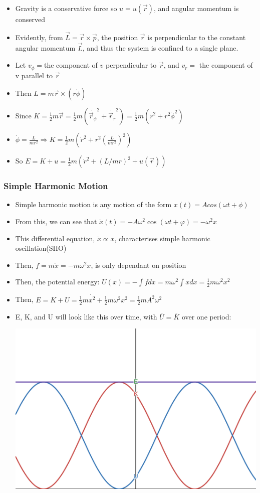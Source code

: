 \documentclass{article}
\begin{document}
\begin{itemize}
    \item Gravity is a conservative force so \(u = u(\vec r)\), and angular momentum is conserved
    \item Evidently, from \(\vec L = \vec r\times\vec p\), the position \(\vec r\) is perpendicular to the constant angular momentum \(\vec L\), and thus the system is confined to a single plane.
    \item Let \(v_{\phi}=\)the component of \(v\) perpendicular to $\vec r$, and \(v_r=\) the component of v parallel to \(\vec r\)
    \item Then \(L=m\vec r\times(r\dot\phi)\)
    \item Since \(K=\frac{1}{2}m\dot{\vec r} = \frac{1}{2}m(\dot{\vec r_{\phi}}^2 +\dot{\vec r_r}^2)=\frac{1}{2}m(\dot r ^2 + r^2\dot\phi ^2)\)
    \item \(\dot\phi = \frac{L}{mr^2} \Rightarrow K = \frac{1}{2}m(\dot r ^2 + r^2(\frac{L}{mr^2})^2)\)
    \item So \(E = K + u = \frac{1}{2}m(\dot r^2 + (L/mr)^2 + u(\vec r))\)
    
\end{itemize}

\subsubsection*{Simple Harmonic Motion}

\begin{itemize}
    \item Simple harmonic motion is any motion of the form \(x(t) = Acos(\omega t + \phi)\)
    \item From this, we can see that \(\ddot x(t) = -A\omega^2\cos(\omega t+\varphi) = -\omega^2x\)
    \item This differential equation, \(\ddot x \propto x\), characterises simple harmonic oscillation(SHO)
    \item Then, \(f =m\ddot x = -m\omega^2x\), is only dependant on position
    \item Then, the potential energy: \(U(x) = -\int f dx = m\omega^2\int x dx=\frac{1}{2}m\omega^2x^2\)
    \item Then, \(E = K + U = \frac{1}{2}m\dot{x^2} + \frac{1}{2}m\omega^2x^2 = \frac{1}{2}mA^2\omega^2\)
    \item E, K, and U will look like this over time, with \(\overline{U} = \overline{K}\) over one period:
    
    \includegraphics[width = 0.5\linewidth]{year1/wfmp/periodic-motion/osciltor-energy.png}
\end{itemize}
\end{document}
